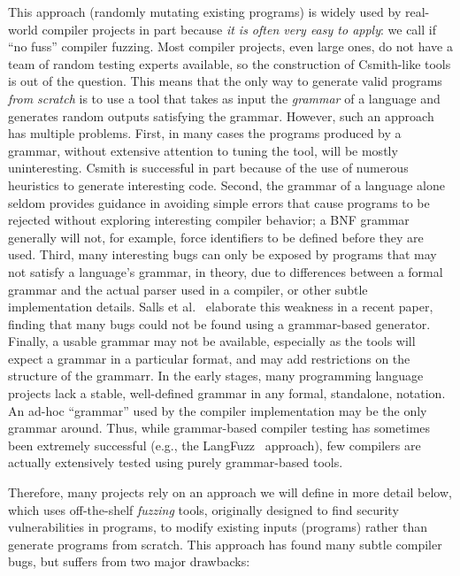 This approach (randomly mutating existing programs) is widely used by
real-world compiler projects in part because \emph{it is often very easy to
  apply}: we call if ``no fuss'' compiler fuzzing.  Most compiler projects, even large ones, do not have a team
of random testing experts available, so the construction of
Csmith-like tools is out of the question.  This means that the only
way to generate valid programs \emph{from scratch} is to use a tool that takes as
input the \emph{grammar} of a language and generates random outputs
satisfying the grammar.   However, such an approach has multiple problems.
First, in many cases the programs produced by a grammar, without
extensive attention to tuning the tool, will be mostly uninteresting.
Csmith is successful in part because of the use of numerous heuristics
to generate interesting code.  Second, the grammar of a language alone
seldom provides guidance in avoiding simple errors that cause programs
to be rejected without exploring interesting compiler behavior; a BNF
grammar generally will not, for example, force identifiers to be
defined before they are used.  Third, many interesting bugs can only
be exposed by programs that may not satisfy a language's grammar, in
theory, due to differences between a formal grammar and the actual
parser used in a compiler, or other subtle implementation details.
Salls et al.~\cite{Salls2021TokenLevel} elaborate this weakness in a
recent paper, finding that many bugs could not be found using a
grammar-based generator.
Finally, a usable grammar may not be available, especially as the
tools will expect a grammar in a particular format, and may add
restrictions on the structure of the grammarr.  In the early stages,
many programming language projects lack a stable, well-defined
grammar in any formal, standalone, notation.  An ad-hoc ``grammar'' used by the compiler implementation may be the
only grammar around.  Thus, while grammar-based compiler
testing has sometimes been extremely successful (e.g., the
LangFuzz~\cite{LangFuzz} approach), few compilers are actually
extensively tested using purely grammar-based tools.

Therefore, many projects rely on an approach we will define in more
detail below, which uses off-the-shelf \emph{fuzzing} tools,
originally designed to find security vulnerabilities in programs, to
modify existing inputs (programs) rather than generate programs from
scratch.  This approach has found many subtle compiler bugs, but
suffers from two major drawbacks:

